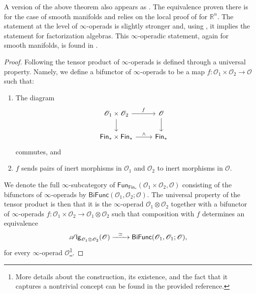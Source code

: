 \documentclass[../text.tex]{subfiles}
\begin{document}
\begin{remark}
    A version of the above theorem also appears as \cite[prop.18]{ginot2015}. The equivalence proven there is for the case of smooth manifolds and relies on the local proof of \cite{lurie_ha} for $\mathbb{R}^n$. The statement at the level of $\infty$-operads is slightly stronger and, using , it implies the statement for factorization algebras. This $\infty$-operadic statement, again for smooth manifolds, is found in \cite[ex.5.4.5.5]{lurie_ha}.
\end{remark}


\begin{proof}
    Following \cite[\S.2.2.5]{lurie_ha} the tensor product of $\infty$-operads is defined through a universal property. Namely, we define a bifunctor of $\infty$-operads to be a map $f: \mathscr{O}_1 \times \mathscr{O}_2 \xrightarrow{} \mathscr{O}$ such that:
    \begin{enumerate}
        \item The diagram
        \begin{equation}
            \begin{tikzcd}
                \mathscr{O}_1 \times \mathscr{O}_2 \arrow[r, "f"] \arrow[d] & \mathscr{O} \arrow[d] \\
                \mathsf{Fin}_* \times \mathsf{Fin}_* \arrow[r, "\wedge"] & \mathsf{Fin}_*
            \end{tikzcd}
        \end{equation}
        commutes, and
        \item $f$ sends pairs of inert morphisms in $\mathscr{O}_1$ and $\mathscr{O}_2$ to inert morphisms in $\mathscr{O}$.
    \end{enumerate}
    We denote the full $\infty$-subcategory of $\mathsf{Fun}_{\mathsf{Fin}_*}(\mathscr{O}_1 \times \mathscr{O}_2, \mathscr{O})$ consisting of the bifunctors of $\infty$-operads by $\mathsf{BiFunc}(\mathscr{O}_1, \mathscr{O}_2; \mathscr{O})$. The universal property of the tensor product is then that it is the $\infty$-operad $\mathscr{O}_1 \otimes \mathscr{O}_2$ together with a bifunctor of $\infty$-operads $f: \mathscr{O}_1 \times \mathscr{O}_2 \xrightarrow{} \mathscr{O}_1 \otimes \mathscr{O}_2$ such that composition with $f$ determines an equivalence
    \begin{equation}
        \mathscr{A} \mathsf{lg}_{\mathscr{O}_1 \otimes \mathscr{O}_2} (\mathscr{O}) \xrightarrow{\ \ \simeq \ \ } \mathsf{BiFunc}(\mathscr{O}_1, \mathscr{O}_1; \mathscr{O}),
    \end{equation}
    for every $\infty$-operad $\mathscr{O}$\footnote{More details about the construction, its existence, and the fact that it captures a nontrivial concept can be found in the provided reference.}.


\end{proof}
\end{document}
